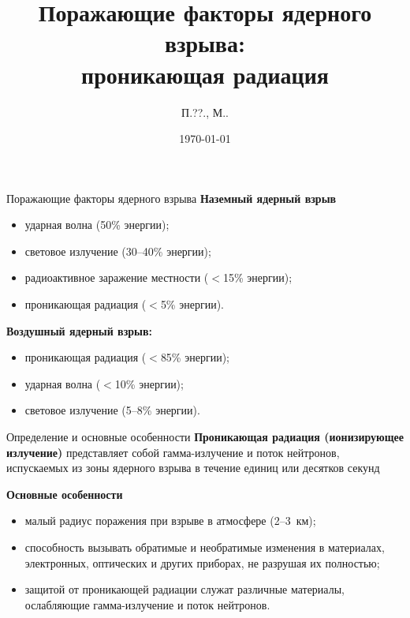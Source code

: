 \documentclass[unicode,lefteqn,c,hyperref={pdfpagelabels=false}]{beamer}
\title[\hbox to 56mm{Проникающая радиация\hfill\insertframenumber\,/\,\inserttotalframenumber}]{Поражающие факторы ядерного взрыва: \\проникающая радиация}
\author[П.\shortspace ??.\shortspaceАндрианов, М.\shortspaceО.\shortspaceБурмистров]{П.\shortspace ??.\shortspaceАндрианов, М.\shortspaceО.\shortspaceБурмистров}
\institute{\vfill Московский физико-технический институт
		\vfill Военная кафедра}
\date{\today}
\begin{document}
\begin{frame}
    \titlepage
\end{frame}
\begin{frame}{Поражающие факторы ядерного взрыва}
    \textbf{Наземный ядерный взрыв}
    \begin{itemize}
    		\item ударная волна (50\% энергии);
    		\item световое излучение (30--40\% энергии);
    		\item радиоактивное заражение местности ($<$15\% энергии);
            \item проникающая радиация ($<$5\% энергии).
    \end{itemize}
    \bigskip
    \textbf{Воздушный ядерный взрыв:}
    \begin{itemize}
            \item проникающая радиация ($<$85\% энергии);
            \item ударная волна ($<$10\% энергии);
            \item световое излучение (5--8\% энергии).
    \end{itemize}

  
\end{frame}

\begin{frame}{Определение и основные особенности}
    \textbf{Проникающая радиация (ионизирующее излучение)}  представляет собой гамма-излучение и поток нейтронов, испускаемых из зоны ядерного взрыва в течение единиц или десятков секунд

    \smallskip

    \textbf{Основные особенности}
    \begin{itemize}
            \item малый радиус поражения при взрыве в атмосфере (2--3~км);
            \item способность вызывать обратимые и необратимые изменения в материалах, электронных, оптических и других приборах, не разрушая их полностью;
            \item защитой от проникающей радиации служат различные материалы, ослабляющие гамма-излучение и поток нейтронов.
    \end{itemize}
\end{frame}
\end{document}
